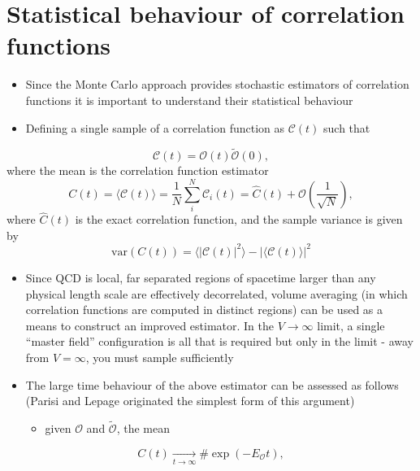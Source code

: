 \section{Statistical behaviour of correlation functions}
\begin{itemize}
    \item Since the Monte Carlo approach provides stochastic estimators of correlation functions it is important to understand their statistical behaviour
    \item Defining a single sample of a correlation function as $\mathcal{C}(t)$ such that 
\end{itemize}
\begin{equation}
    \mathcal{C}(t) = \mathcal{O}(t)\tilde{\mathcal{O}}(0),
\end{equation}
where the mean is the correlation function estimator
\begin{equation}
    C(t) = \langle \mathcal{C}(t) \rangle = \frac{1}{N}\sum_i^N \mathcal{C}_i(t) = \hat{C}(t) + \mathcal{O}\left(\frac{1}{\sqrt{N}}\right),
\end{equation}
where $\hat{C}(t)$ is the exact correlation function, and the sample variance is given by
\begin{equation}
    \text{var}(C(t)) = \langle | \mathcal{C}(t)|^2 \rangle - |\langle \mathcal{C}(t) \rangle | ^2
\end{equation}
\begin{itemize}
    \item Since QCD is local, far separated regions of spacetime larger than any physical length scale are effectively decorrelated, volume averaging (in which correlation functions are computed in distinct regions) can be used as a means to construct an improved estimator. In the $V \rightarrow \infty$ limit, a single ``master field'' configuration is all that is required but only in the limit - away from $V = \infty$, you must sample sufficiently
    \item The large time behaviour of the above estimator can be assessed as follows (Parisi and Lepage originated the simplest form of this argument)
    \begin{itemize}
        \item given $\mathcal{O}$ and $\tilde{\mathcal{O}}$, the mean
    \end{itemize}
\end{itemize}
\begin{equation}
    C(t) \underset{t \to \infty}{\rightarrow} \# \exp(-E_\mathcal{O} t),
\end{equation}

